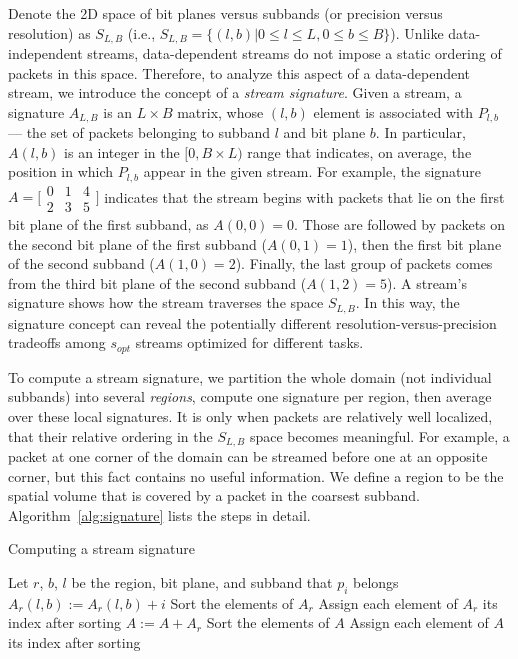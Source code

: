 Denote the 2D space of bit planes versus subbands (or precision versus resolution) as $S_{L,B}$
(i.e., $S_{L,B}=\{(l,b) | 0\leq l\leq L, 0\leq b\leq B\}$). Unlike data-independent streams,
data-dependent streams do not impose a static ordering of packets in this space. Therefore, to
analyze this aspect of a data-dependent stream, we introduce the concept of a \emph{stream
signature}. Given a stream, a signature $A_{L,B}$ is an $L \times B$ matrix, whose $(l,b)$ element
is associated with $P_{l,b}$ --- the set of packets belonging to subband $l$ and bit plane $b$. In
particular, $A(l,b)$ is an integer in the $[0, B\times L)$ range that indicates, on average, the
position in which $P_{l,b}$ appear in the given stream. For example, the signature $A=\bigl[
\begin{smallmatrix}0 & 1 & 4\\ 2 & 3 & 5\end{smallmatrix}\bigr]$ indicates that the stream begins
with packets that lie on the first bit plane of the first subband, as $A(0,0)=0$. Those are followed
by packets on the second bit plane of the first subband ($A(0,1)=1$), then the first bit plane of
the second subband ($A(1,0)=2$). Finally, the last group of packets comes from the third bit plane
of the second subband ($A(1,2)=5$). A stream's signature shows how the stream traverses the space
$S_{L,B}$. In this way, the signature concept can reveal the potentially different
resolution-versus-precision tradeoffs among $s_{opt}$ streams optimized for different tasks.

To compute a stream signature, we partition the whole domain (not individual subbands) into several
\emph{regions}, compute one signature per region, then average over these local signatures. It is
only when packets are relatively well localized, that their relative ordering in the $S_{L,B}$ space
becomes meaningful. For example, a packet at one corner of the domain can be streamed before one at
an opposite corner, but this fact contains no useful information. We define a region to be the
spatial volume that is covered by a packet in the coarsest subband. Algorithm~\ref{alg:signature}
lists the steps in detail.

\begin{algorithm}[h]
  \small
  \caption{Computing a stream signature}
  \begin{algorithmic}[1]
			\State Let $r$, $b$, $l$ be the region, bit plane, and subband that $p_i$ belongs
			\State $A_r(l,b) := A_r(l,b)+i$
		\EndFor
			\State Sort the elements of $A_r$
			\State Assign each element of $A_r$ its index after sorting
			\State $A := A+A_r$
		\EndFor
		\State Sort the elements of $A$
		\State Assign each element of $A$ its index after sorting
	\end{algorithmic}
	\label{alg:signature}
\end{algorithm}

